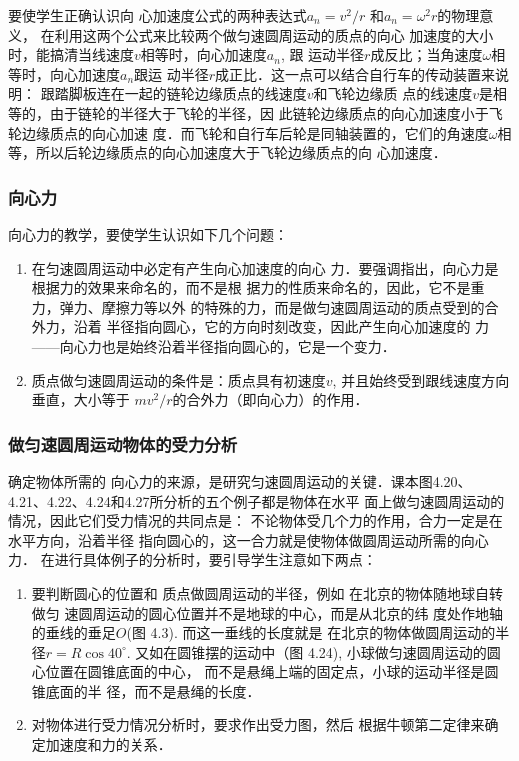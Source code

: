要使学生正确认识向
心加速度公式的两种表达式$a_n=v^2/r$
和$a_n=\omega^2 r$的物理意义，
在利用这两个公式来比较两个做匀速圆周运动的质点的向心
加速度的大小时，能搞清当线速度$v$相等时，向心加速度$a_n$, 跟
运动半径$r$成反比；当角速度$\omega$相等时，向心加速度$a_n$跟运
动半径$r$成正比．这一点可以结合自行车的传动装置来说明：
跟踏脚板连在一起的链轮边缘质点的线速度$v$和飞轮边缘质
点的线速度$v$是相等的，由于链轮的半径大于飞轮的半径，因
此链轮边缘质点的向心加速度小于飞轮边缘质点的向心加速
度．而飞轮和自行车后轮是同轴装置的，它们的角速度$\omega$相
等，所以后轮边缘质点的向心加速度大于飞轮边缘质点的向
心加速度．

\subsubsection{向心力}

向心力的教学，要使学生认识如下几个问题：
\begin{enumerate}
\item 在匀速圆周运动中必定有产生向心加速度的向心
力．要强调指出，向心力是根据力的效果来命名的，而不是根
据力的性质来命名的，因此，它不是重力，弹力、摩擦力等以外
的特殊的力，而是做匀速圆周运动的质点受到的合外力，沿着
半径指向圆心，它的方向时刻改变，因此产生向心加速度的
力——向心力也是始终沿着半径指向圆心的，它是一个变力．
\item 质点做匀速圆周运动的条件是：质点具有初速度$v$,
并且始终受到跟线速度方向垂直，大小等于
$mv^2/r$的合外力（即向心力）的作用．
\end{enumerate}

\subsubsection{做匀速圆周运动物体的受力分析}

确定物体所需的
向心力的来源，是研究匀速圆周运动的关键．课本图4.20、
4.21、4.22、4.24和4.27所分析的五个例子都是物体在水平
面上做匀速圆周运动的情况，因此它们受力情况的共同点是：
不论物体受几个力的作用，合力一定是在水平方向，沿着半径
指向圆心的，这一合力就是使物体做圆周运动所需的向心力．
在进行具体例子的分析时，要引导学生注意如下两点：

\begin{enumerate}
\item 要判断圆心的位置和
质点做圆周运动的半径，例如
在北京的物体随地球自转做匀
速圆周运动的圆心位置并不是地球的中心，而是从北京的纬
度处作地轴的垂线的垂足$O$(图
4.3). 而这一垂线的长度就是
在北京的物体做圆周运动的半
径$r=R\cos40^{\circ}$. 又如在圆锥摆的运动中（图
4.24), 小球做匀速圆周运动的圆心位置在圆锥底面的中心，
而不是悬绳上端的固定点，小球的运动半径是圆锥底面的半
径，而不是悬绳的长度．
\item 对物体进行受力情况分析时，要求作出受力图，然后
根据牛顿第二定律来确定加速度和力的关系．
\end{enumerate}

